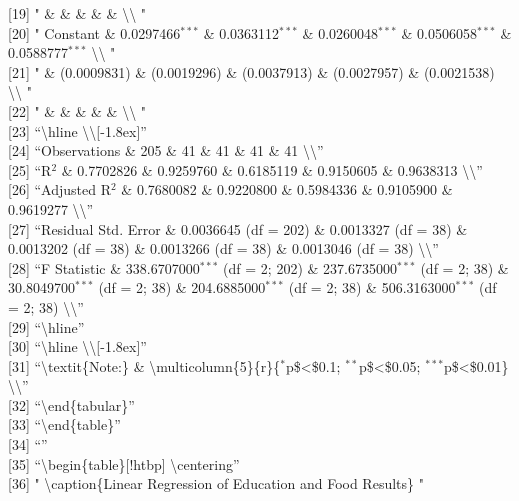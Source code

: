 \documentclass[]{article}
\begin{document}
{[}19{]} " \& \& \& \& \& \textbackslash{}\textbackslash{} "\\
{[}20{]} " Constant \& 0.0297466\(^{***}\) \& 0.0363112\(^{***}\) \&
0.0260048\(^{***}\) \& 0.0506058\(^{***}\) \& 0.0588777\(^{***}\)
\textbackslash{}\textbackslash{} "\\
{[}21{]} " \& (0.0009831) \& (0.0019296) \& (0.0037913) \& (0.0027957)
\& (0.0021538) \textbackslash{}\textbackslash{} "\\
{[}22{]} " \& \& \& \& \& \textbackslash{}\textbackslash{} "\\
{[}23{]} ``\textbackslash{}hline
\textbackslash{}\textbackslash{}{[}-1.8ex{]}''\\
{[}24{]} ``Observations \& 205 \& 41 \& 41 \& 41 \& 41
\textbackslash{}\textbackslash{}''\\
{[}25{]} ``R\(^{2}\) \& 0.7702826 \& 0.9259760 \& 0.6185119 \& 0.9150605
\& 0.9638313 \textbackslash{}\textbackslash{}''\\
{[}26{]} ``Adjusted R\(^{2}\) \& 0.7680082 \& 0.9220800 \& 0.5984336 \&
0.9105900 \& 0.9619277 \textbackslash{}\textbackslash{}''\\
{[}27{]} ``Residual Std. Error \& 0.0036645 (df = 202) \& 0.0013327 (df
= 38) \& 0.0013202 (df = 38) \& 0.0013266 (df = 38) \& 0.0013046 (df =
38) \textbackslash{}\textbackslash{}''\\
{[}28{]} ``F Statistic \& 338.6707000\(^{***}\) (df = 2; 202) \&
237.6735000\(^{***}\) (df = 2; 38) \& 30.8049700\(^{***}\) (df = 2; 38)
\& 204.6885000\(^{***}\) (df = 2; 38) \& 506.3163000\(^{***}\) (df = 2;
38) \textbackslash{}\textbackslash{}''\\
{[}29{]} ``\textbackslash{}hline''\\
{[}30{]} ``\textbackslash{}hline
\textbackslash{}\textbackslash{}{[}-1.8ex{]}''\\
{[}31{]} ``\textbackslash{}textit\{Note:\} \&
\textbackslash{}multicolumn\{5\}\{r\}\{\(^{*}\)p\$\textless{}\$0.1;
\(^{**}\)p\$\textless{}\$0.05; \(^{***}\)p\$\textless{}\$0.01\}
\textbackslash{}\textbackslash{}''\\
{[}32{]} ``\textbackslash{}end\{tabular\}''\\
{[}33{]} ``\textbackslash{}end\{table\}''\\
{[}34{]} ``''\\
{[}35{]} ``\textbackslash{}begin\{table\}{[}!htbp{]}
\textbackslash{}centering''\\
{[}36{]} " \textbackslash{}caption\{Linear Regression of Education and
Food Results\} "\\
\end{document}
